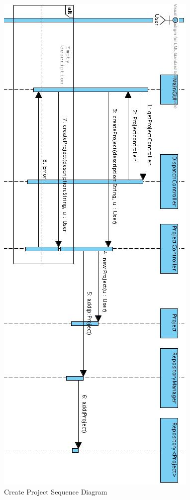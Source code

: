 			\begin{figure}[H]
				\begin{center}
					\includegraphics[scale=0.5]{images/create_project.jpg}
				\end{center}
				\caption{Create Project Sequence Diagram}
			\end{figure}
